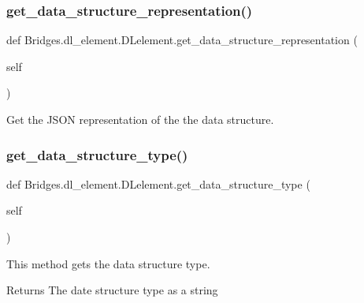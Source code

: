 \subsubsection{\texorpdfstring{get\+\_\+data\+\_\+structure\+\_\+representation()}{get\_data\_structure\_representation()}}
{\footnotesize\ttfamily def Bridges.\+dl\+\_\+element.\+D\+Lelement.\+get\+\_\+data\+\_\+structure\+\_\+representation (\begin{DoxyParamCaption}\item[{}]{self }\end{DoxyParamCaption})}



Get the J\+S\+ON representation of the the data structure. 

\mbox{\label{class_bridges_1_1dl__element_1_1_d_lelement_a8e58440740696b00b0fbf466311a2e82}} 
\subsubsection{\texorpdfstring{get\+\_\+data\+\_\+structure\+\_\+type()}{get\_data\_structure\_type()}}
{\footnotesize\ttfamily def Bridges.\+dl\+\_\+element.\+D\+Lelement.\+get\+\_\+data\+\_\+structure\+\_\+type (\begin{DoxyParamCaption}\item[{}]{self }\end{DoxyParamCaption})}



This method gets the data structure type. 

\begin{DoxyReturn}{Returns}
The date structure type as a string 
\end{DoxyReturn}
\mbox{\label{class_bridges_1_1dl__element_1_1_d_lelement_a494dbc772c5be2fedc1543c33ff18773}} 
